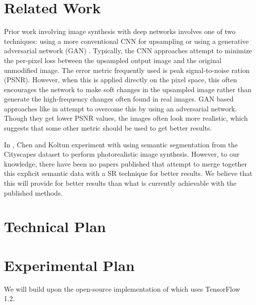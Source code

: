 \documentclass[10pt,twocolumn,letterpaper]{article}
\begin{document}
\section{Related Work}
Prior work involving image synthesis with deep networks involves one of two
techniques: using a more conventional CNN for upsampling
\cite{PerceptualLosses} \cite{RealtimeCNN} \cite{DeeplyRecursive} or using a
generative adversarial network (GAN) \cite{GAN}. Typically, the CNN approaches
attempt to minimize the per-pixel loss between the upsampled output image and
the original unmodified image. The error metric frequently used is peak
signal-to-noise ration (PSNR). However, when this is applied directly on the
pixel space, this often encourages the network to make soft changes in the
upsampled image rather than generate the high-frequency changes often found in
real images. GAN based approaches like in \cite{SRGAN} attempt to overcome this
by using an adversarial network. Though they get lower PSNR values, the images
often look more realistic, which suggests that some other metric should be used
to get better results.

In \cite{ImageSynthesis}, Chen and Koltun experiment with using semantic
segmentation from the Cityscapes dataset \cite{Cityscapes} to perform
photorealistic image synthesis. However, to our knowledge, there have been no
papers published that attempt to merge together this explicit semantic data
with a SR technique for better results. We believe that this will provide for
better results than what is currently achievable with the published methods.


\section{Technical Plan}


\section{Experimental Plan}
We will build upon the open-source implementation of \cite{SRGAN} which uses
TensorFlow 1.2.

\end{document}
